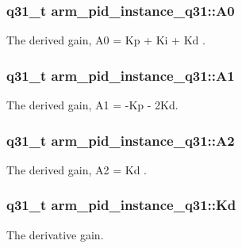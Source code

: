 \subsubsection[{\texorpdfstring{A0}{A0}}]{\setlength{\rightskip}{0pt plus 5cm}q31\+\_\+t arm\+\_\+pid\+\_\+instance\+\_\+q31\+::\+A0}\hypertarget{structarm__pid__instance__q31_aa5332635ce9c7078cdb4c1ecf442eadd}{}\label{structarm__pid__instance__q31_aa5332635ce9c7078cdb4c1ecf442eadd}
The derived gain, A0 = Kp + Ki + Kd . 
\subsubsection[{\texorpdfstring{A1}{A1}}]{\setlength{\rightskip}{0pt plus 5cm}q31\+\_\+t arm\+\_\+pid\+\_\+instance\+\_\+q31\+::\+A1}\hypertarget{structarm__pid__instance__q31_a2f7492bd6fb92fae5e2de7fbbec39b0e}{}\label{structarm__pid__instance__q31_a2f7492bd6fb92fae5e2de7fbbec39b0e}
The derived gain, A1 = -\/\+Kp -\/ 2\+Kd. 
\subsubsection[{\texorpdfstring{A2}{A2}}]{\setlength{\rightskip}{0pt plus 5cm}q31\+\_\+t arm\+\_\+pid\+\_\+instance\+\_\+q31\+::\+A2}\hypertarget{structarm__pid__instance__q31_a3e34537c53af4f9ad7bfffa4dff27c82}{}\label{structarm__pid__instance__q31_a3e34537c53af4f9ad7bfffa4dff27c82}
The derived gain, A2 = Kd . 
\subsubsection[{\texorpdfstring{Kd}{Kd}}]{\setlength{\rightskip}{0pt plus 5cm}q31\+\_\+t arm\+\_\+pid\+\_\+instance\+\_\+q31\+::\+Kd}\hypertarget{structarm__pid__instance__q31_aab4ff371d14441df501f1169f71cbd17}{}\label{structarm__pid__instance__q31_aab4ff371d14441df501f1169f71cbd17}
The derivative gain. 

